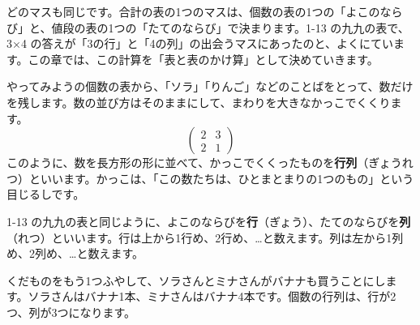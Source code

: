 どのマスも同じです。合計の表の1つのマスは、個数の表の1つの「よこのならび」と、値段の表の1つの「たてのならび」で決まります。1-13 の九九の表で、3×4 の答えが「3の行」と「4の列」の出会うマスにあったのと、よくにています。この章では、この計算を「表と表のかけ算」として決めていきます。

\begin{omoidasou}
\end{omoidasou}



\label{bk:7-1:gyoretsu}やってみようの個数の表から、「ソラ」「りんご」などのことばをとって、数だけを残します。数の並び方はそのままにして、まわりを大きなかっこでくくります。
\[ \begin{pmatrix} 2 & 3\\ 2 & 1 \end{pmatrix} \]
このように、数を長方形の形に並べて、かっこでくくったものを\textbf{行列}（ぎょうれつ）といいます。かっこは、「この数たちは、ひとまとまりの1つのもの」という目じるしです。

1-13 の九九の表と同じように、よこのならびを\textbf{行}（ぎょう）、たてのならびを\textbf{列}（れつ）といいます。行は上から1行め、2行め、…と数えます。列は左から1列め、2列め、…と数えます。

くだものをもう1つふやして、ソラさんとミナさんがバナナも買うことにします。ソラさんはバナナ1本、ミナさんはバナナ4本です。個数の行列は、行が2つ、列が3つになります。

